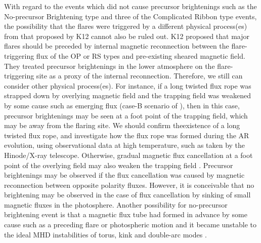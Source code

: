 \documentclass[10pt,preprint2]{aastex}
\begin{document}
With regard to the events which did not cause precursor brightenings such as the No-precursor Brightening type and three of the Complicated Ribbon type events, the possibility that the flares were triggered by a different physical process(es) from that proposed by K12 cannot also be ruled out.
K12 proposed that major flares should be preceded by internal magnetic reconnection between the flare-triggering flux of the OP or RS types and pre-existing sheared magnetic field.
They treated precursor brightenings in the lower atmosphere on the flare-triggering site as a proxy of the internal reconnection.
Therefore, we still can consider other physical process(es).
For instance, if a long twisted flux rope was strapped down by overlying magnetic field and the trapping field was weakened by some cause such as emerging flux (case-B scenario of \citet{chenshibata00}), then in this case, precursor brightenings may be seen at a foot point of the trapping field, which may be away from the flaring site.
We should confirm theexistence of a long twisted flux rope, and investigate how the flux rope was formed during the AR evolution, using observational data at high temperature, such as taken by the Hinode/X-ray telescope.
Otherwise, gradual magnetic flux cancellation at a foot point of the overlying field may also weaken the trapping field \citep{vanBallegooijen89, Zhang01, Green11}.
Precursor brightenings may be observed if the flux cancellation was caused by magnetic reconnection between opposite polarity fluxes.
However, it is conceivable that no brightening may be observed in the case of flux cancellation by sinking of small magnetic fluxes in the photosphere.
Another possibility for no-precursor brightening event is that a magnetic flux tube had formed in advance by some cause such as a preceding flare or photospheric motion and it became unstable to the ideal MHD instabilities of torus, kink and double-arc modes \citep{kliemtorok06, torokkliem05, ishiguro17}.
\end{document}

